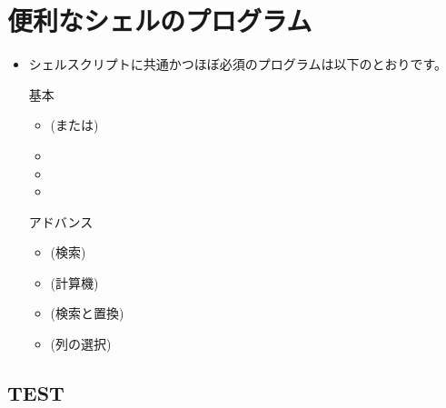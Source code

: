 \documentclass{jsarticle}
\begin{document}
\section{便利なシェルのプログラム}


\begin{itemize}

\item シェルスクリプトに共通かつほぼ必須のプログラムは以下のとおりです。

\bigskip

基本

	\begin{itemize}
	\item {\color{red}} (または{\color{red}\Q{[ ]}})
	\item {\color{red}}
	\item {\color{red}}
	\item {\color{red}}
	\end{itemize}

アドバンス
	\begin{itemize}
	\item {\color{red}} (検索)
	\item {\color{red}} (計算機)
	\item {\color{red}} (検索と置換)
	\item {\color{red}} (列の選択)	
	\end{itemize}

\end{itemize}


\subsection{TEST}
\end{document}
